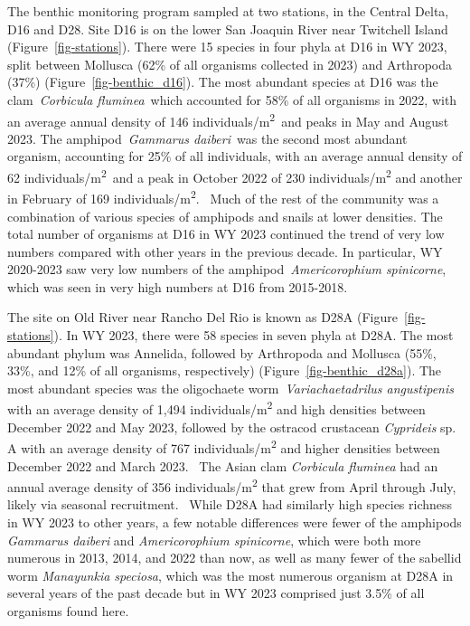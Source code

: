 \documentclass[
]{article}
\begin{document}
The benthic monitoring program sampled at two stations, in the Central
Delta, D16 and D28. Site D16 is on the lower San Joaquin River near
Twitchell Island (Figure~\ref{fig-stations}). There were 15 species in
four phyla at D16 in WY 2023, split between Mollusca (62\% of all
organisms collected in 2023) and Arthropoda (37\%)
(Figure~\ref{fig-benthic_d16}). The most abundant species at D16 was the
clam~\emph{Corbicula fluminea}~which accounted for 58\% of all organisms
in 2022, with an average annual density of 146
individuals/m\textsuperscript{2}~and peaks in May and August 2023. The
amphipod~\emph{Gammarus daiberi}~was the second most abundant organism,
accounting for 25\% of all individuals, with an average annual density
of 62 individuals/m\textsuperscript{2}~and a peak in October 2022 of 230
individuals/m\textsuperscript{2} and another in February of 169
individuals/m\textsuperscript{2}.~ Much of the rest of the community was
a combination of various species of amphipods and snails at lower
densities. The total number of organisms at D16 in WY 2023 continued the
trend of very low numbers compared with other years in the previous
decade. In particular, WY 2020-2023 saw very low numbers of the
amphipod~\emph{Americorophium spinicorne}, which was seen in very high
numbers at D16 from 2015-2018.

The site on Old River near Rancho Del Rio is known as D28A
(Figure~\ref{fig-stations}). In WY 2023, there were 58 species in seven
phyla at D28A. The most abundant phylum was Annelida, followed by
Arthropoda and Mollusca (55\%, 33\%, and 12\% of all organisms,
respectively) (Figure~\ref{fig-benthic_d28a}). The most abundant species
was the oligochaete worm~\emph{Variachaetadrilus angustipenis} with an
average density of 1,494 individuals/m\textsuperscript{2} and high
densities between December 2022 and May 2023, followed by the ostracod
crustacean \emph{Cyprideis} sp. A with an average density of 767
individuals/m\textsuperscript{2} and higher densities between December
2022 and March 2023.~ The Asian clam \emph{Corbicula fluminea} had an
annual average density of 356 individuals/m\textsuperscript{2} that grew
from April through July, likely via seasonal recruitment.~ While D28A
had similarly high species richness in WY 2023 to other years, a few
notable differences were fewer of the amphipods \emph{Gammarus daiberi}
and \emph{Americorophium spinicorne}, which were both more numerous in
2013, 2014, and 2022 than now, as well as many fewer of the sabellid
worm \emph{Manayunkia speciosa}, which was the most numerous organism at
D28A in several years of the past decade but in WY 2023 comprised just
3.5\% of all organisms found here.
\end{document}
